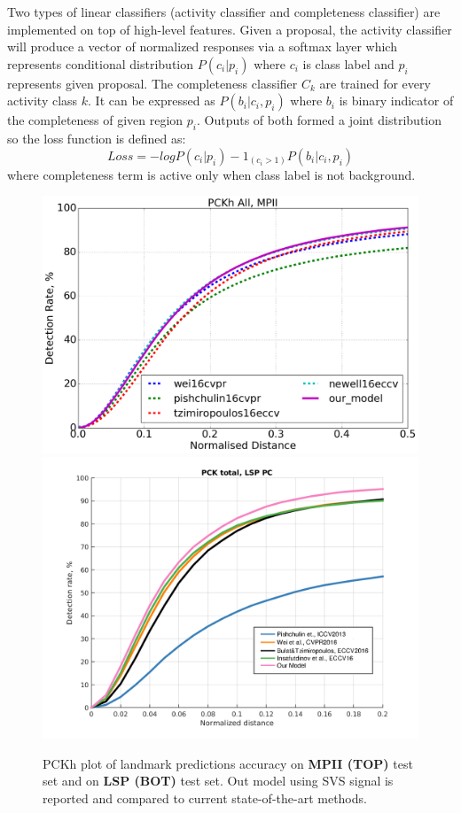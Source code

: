 Two types of linear classifiers (activity classifier and completeness classifier) are implemented on top of high-level features. Given a proposal, the activity classifier will produce a vector of normalized responses via a softmax layer which represents conditional distribution $P(c_i|p_i)$ where $c_i$ is class label and $p_i$ represents given proposal. The completeness classifier $C_k$ are trained for every activity class $k$. It can be expressed as $P(b_i|c_i,p_i)$ where $b_i$ is binary indicator of the completeness of given region $p_i$. Outputs of both formed a joint distribution so the loss function is defined as: 
$$Loss=-log P(c_i|p_i)-1_{(c_i>1)}P(b_i|c_i,p_i)$$
where completeness term is active only when class label is not background.

\begin{figure}
    \begin{center}
      \includegraphics[width=.8\linewidth]{resources/Human_Poses/results/pckh-total-mpii}
      \includegraphics[width=.9\linewidth]{resources/Human_Poses/results/pck-total-lsp-PC}
    \end{center}
    \caption{PCKh plot of landmark predictions accuracy on \textbf{MPII (TOP)} test set and on \textbf{LSP (BOT)} test set. Out model using SVS signal is reported and compared to current state-of-the-art methods.}
    \label{fig:mpii}
    \label{fig:lsp}
\end{figure}

